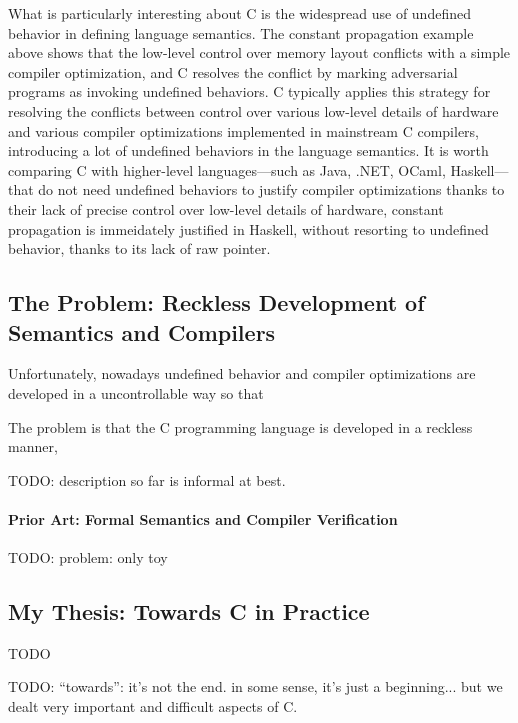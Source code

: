 What is particularly interesting about C is the widespread use of undefined behavior in defining
language semantics.  The constant propagation example above shows that the low-level control over
memory layout conflicts with a simple compiler optimization, and C resolves the conflict by marking
adversarial programs as invoking undefined behaviors.  C typically applies this strategy for
resolving the conflicts between control over various low-level details of hardware and various
compiler optimizations implemented in mainstream C compilers, introducing a lot of undefined
behaviors in the language semantics.  It is worth comparing C with higher-level languages---such as
Java, .NET, OCaml, Haskell---that do not need undefined behaviors to justify compiler optimizations
thanks to their lack of precise control over low-level details of hardware, \eg{} constant
propagation is immeidately justified in Haskell, without resorting to undefined behavior, thanks to
its lack of raw pointer.


\subsection{The Problem: Reckless Development of Semantics and Compilers}

Unfortunately, nowadays undefined behavior and compiler optimizations are developed in a
uncontrollable way so that








The problem is that the C programming language is developed in a reckless manner,

TODO: description so far is informal at best.


\paragraph{Prior Art: Formal Semantics and Compiler Verification}

TODO: problem: only toy



\subsection{My Thesis: Towards C in Practice}

TODO

TODO: ``towards'': it's not the end.  in some sense, it's just a beginning...  but we dealt very
important and difficult aspects of C.


